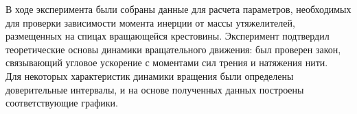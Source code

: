 В ходе эксперимента были собраны данные для расчета параметров, необходимых для проверки зависимости момента инерции от массы утяжелителей, размещенных на спицах вращающейся крестовины. Эксперимент подтвердил теоретические основы динамики вращательного движения: был проверен закон, связывающий угловое ускорение с моментами сил трения и натяжения нити. \\
Для некоторых характеристик динамики вращения были определены доверительные интервалы, и на основе полученных данных построены соответствующие графики.